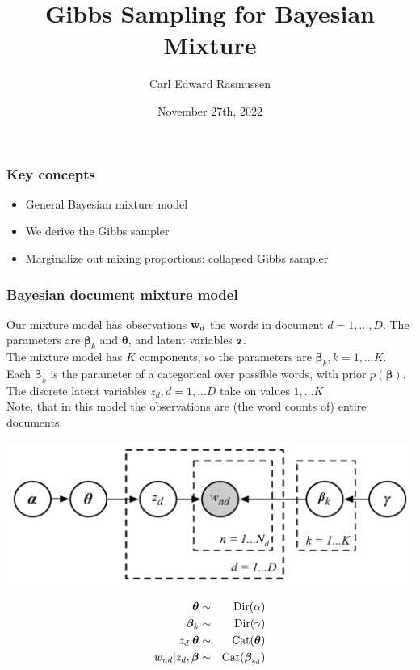 

\title{Gibbs Sampling for Bayesian Mixture}
\author{Carl Edward Rasmussen}
\date{November 27th, 2022}




\begin{frame}
\titlepage
\end{frame}


\begin{frame}
\frametitle{Key concepts}

\begin{itemize}
\item General Bayesian mixture model
\item We derive the Gibbs sampler
\item Marginalize out mixing proportions: collapsed Gibbs sampler
\end{itemize}

\end{frame}


\begin{frame}
\frametitle{Bayesian document mixture model}

Our mixture model has observations ${\bf w}_d$ the words in document
$d=1,\ldots,D$. The parameters are $\boldsymbol\beta_k$ and $\boldsymbol\theta$, and latent variables ${\bf z}$.\\[1ex]

The mixture model has $K$ components, so the parameters are
$\boldsymbol\beta_k, k=1,\ldots K$. Each $\boldsymbol\beta_k$ is the
parameter of a categorical over possible words, with prior
$p(\boldsymbol\beta)$. The discrete latent variables
$z_d, d=1,\ldots D$ take on values $1,\dots
K$.\\[1ex]

Note, that in this model the observations are (the word counts of)
entire documents.

\begin{minipage}{0.7\linewidth}
\centerline{\includegraphics[width=0.9\linewidth]{bayes_mix_categorical_model}}
\end{minipage}
\begin{minipage}{0.29\linewidth}
{\small
\begin{eqnarray*}
\boldsymbol{\theta} & \sim & \mathrm{Dir}(\alpha) \\
\boldsymbol{\beta}_k & \sim & \mathrm{Dir}(\gamma) \\
z_d | \boldsymbol{\theta} & \sim & \rm{Cat}(\boldsymbol{\theta})\\
w_{nd} | z_d, \boldsymbol{\beta} & \sim & \rm{Cat}(\boldsymbol{\beta}_{z_d})
\end{eqnarray*}
}
\end{minipage}
\end{frame}



